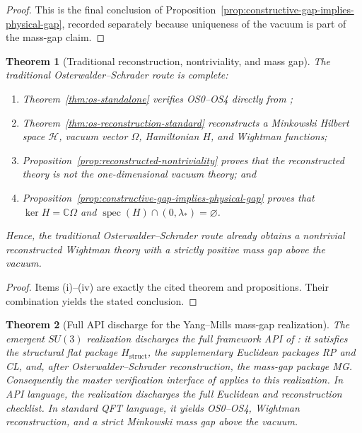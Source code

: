 \documentclass[11pt]{article}
\newtheorem{theorem}{Theorem}[section]
\theoremstyle{definition}
\theoremstyle{remark}
\newcommand{\C}{\mathbb C}
\newcommand{\mcH}{\mathcal H}
\newcommand{\spec}{\operatorname{spec}}
\begin{document}
\begin{proof}
This is the final conclusion of
Proposition~\ref{prop:constructive-gap-implies-physical-gap}, recorded
separately because uniqueness of the vacuum is part of the mass-gap claim.
\end{proof}

\begin{theorem}[Traditional reconstruction, nontriviality, and mass gap]
\label{thm:traditional-endgame}
The traditional Osterwalder--Schrader route is complete:
\begin{enumerate}[label=\textnormal{(\roman*)},leftmargin=1.5em]
\item Theorem~\ref{thm:os-standalone} verifies OS0--OS4 directly from
\cite{convergence,lattice,quantization};
\item Theorem~\ref{thm:os-reconstruction-standard} reconstructs a Minkowski
Hilbert space $\mcH$, vacuum vector $\Omega$, Hamiltonian $H$, and Wightman
functions;
\item Proposition~\ref{prop:reconstructed-nontriviality} proves that the
reconstructed theory is not the one-dimensional vacuum theory; and
\item Proposition~\ref{prop:constructive-gap-implies-physical-gap} proves that
$\ker H=\C\Omega$ and $\spec(H)\cap(0,\lambda_*)=\varnothing$.
\end{enumerate}
Hence, the traditional Osterwalder--Schrader route already
obtains a nontrivial reconstructed Wightman theory with a strictly positive
mass gap above the vacuum.
\end{theorem}

\begin{proof}
Items \textnormal{(i)}--\textnormal{(iv)} are exactly the cited theorem and
propositions.  Their combination yields the stated conclusion.
\end{proof}

\begin{theorem}[Full API discharge for the Yang--Mills mass-gap realization]
\label{thm:api-full}
The emergent $SU(3)$ realization discharges the full framework API of
\cite{axioms}: it satisfies the structural flat package
$H_{\mathrm{struct}}$, the supplementary Euclidean packages RP and CL, and,
after Osterwalder--Schrader reconstruction, the mass-gap package MG.
Consequently the master verification interface of \cite{axioms} applies to this
realization.  In API language, the realization discharges the full Euclidean
and reconstruction checklist.  In standard QFT language, it yields OS0--OS4,
Wightman reconstruction, and a strict Minkowski mass gap above the vacuum.
\end{theorem}
\end{document}
